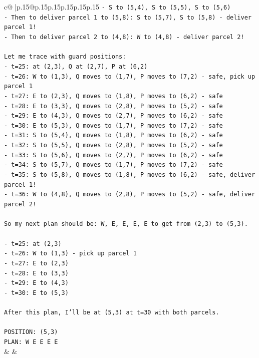 \documentclass{article}
\begin{document}
{\begin{supertabular}{c@{$\;$}|p{.15\linewidth}@{}p{.15\linewidth}p{.15\linewidth}p{.15\linewidth}p{.15\linewidth}p{.15\linewidth}}
{{{\texttt{{-} S to (5,4), S to (5,5), S to (5,6)} \\
\texttt{{-} Then to deliver parcel 1 to (5,8): S to (5,7), S to (5,8) {-} deliver parcel 1!} \\
\texttt{{-} Then to deliver parcel 2 to (4,8): W to (4,8) {-} deliver parcel 2!} \\
\\ 
\texttt{Let me trace with guard positions:} \\
\texttt{{-} t=25: at (2,3), Q at (2,7), P at (6,2)} \\
\texttt{{-} t=26: W to (1,3), Q moves to (1,7), P moves to (7,2) {-} safe, pick up parcel 1} \\
\texttt{{-} t=27: E to (2,3), Q moves to (1,8), P moves to (6,2) {-} safe} \\
\texttt{{-} t=28: E to (3,3), Q moves to (2,8), P moves to (5,2) {-} safe} \\
\texttt{{-} t=29: E to (4,3), Q moves to (2,7), P moves to (6,2) {-} safe} \\
\texttt{{-} t=30: E to (5,3), Q moves to (1,7), P moves to (7,2) {-} safe} \\
\texttt{{-} t=31: S to (5,4), Q moves to (1,8), P moves to (6,2) {-} safe} \\
\texttt{{-} t=32: S to (5,5), Q moves to (2,8), P moves to (5,2) {-} safe} \\
\texttt{{-} t=33: S to (5,6), Q moves to (2,7), P moves to (6,2) {-} safe} \\
\texttt{{-} t=34: S to (5,7), Q moves to (1,7), P moves to (7,2) {-} safe} \\
\texttt{{-} t=35: S to (5,8), Q moves to (1,8), P moves to (6,2) {-} safe, deliver parcel 1!} \\
\texttt{{-} t=36: W to (4,8), Q moves to (2,8), P moves to (5,2) {-} safe, deliver parcel 2!} \\
\\ 
\texttt{So my next plan should be: W, E, E, E, E to get from (2,3) to (5,3).} \\
\\ 
\texttt{{-} t=25: at (2,3)} \\
\texttt{{-} t=26: W to (1,3) {-} pick up parcel 1} \\
\texttt{{-} t=27: E to (2,3)} \\
\texttt{{-} t=28: E to (3,3)} \\
\texttt{{-} t=29: E to (4,3)} \\
\texttt{{-} t=30: E to (5,3)} \\
\\ 
\texttt{After this plan, I'll be at (5,3) at t=30 with both parcels.} \\
\\ 
\texttt{POSITION: (5,3)} \\
\texttt{PLAN: W E E E E} \\
            }
        }
    }
    & & \\ \\


\end{supertabular}}
\end{document}
